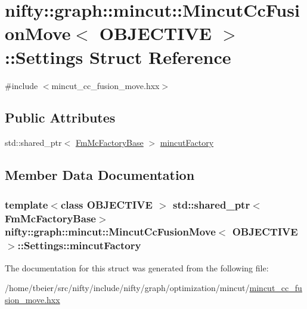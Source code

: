 \hypertarget{structnifty_1_1graph_1_1mincut_1_1MincutCcFusionMove_1_1Settings}{}\section{nifty\+:\+:graph\+:\+:mincut\+:\+:Mincut\+Cc\+Fusion\+Move$<$ O\+B\+J\+E\+C\+T\+I\+V\+E $>$\+:\+:Settings Struct Reference}
\label{structnifty_1_1graph_1_1mincut_1_1MincutCcFusionMove_1_1Settings}


{\ttfamily \#include $<$mincut\+\_\+cc\+\_\+fusion\+\_\+move.\+hxx$>$}

\subsection*{Public Attributes}
\begin{DoxyCompactItemize}
\item 
std\+::shared\+\_\+ptr$<$ \hyperlink{classnifty_1_1graph_1_1mincut_1_1MincutCcFusionMove_a6246ad240ba42965159b1186402d8394}{Fm\+Mc\+Factory\+Base} $>$ \hyperlink{structnifty_1_1graph_1_1mincut_1_1MincutCcFusionMove_1_1Settings_a707b1beef7dd760260d0a1152e1037f1}{mincut\+Factory}
\end{DoxyCompactItemize}


\subsection{Member Data Documentation}
\hypertarget{structnifty_1_1graph_1_1mincut_1_1MincutCcFusionMove_1_1Settings_a707b1beef7dd760260d0a1152e1037f1}{}
\subsubsection[{mincut\+Factory}]{\setlength{\rightskip}{0pt plus 5cm}template$<$class O\+B\+J\+E\+C\+T\+I\+V\+E $>$ std\+::shared\+\_\+ptr$<${\bf Fm\+Mc\+Factory\+Base}$>$ {\bf nifty\+::graph\+::mincut\+::\+Mincut\+Cc\+Fusion\+Move}$<$ O\+B\+J\+E\+C\+T\+I\+V\+E $>$\+::Settings\+::mincut\+Factory}\label{structnifty_1_1graph_1_1mincut_1_1MincutCcFusionMove_1_1Settings_a707b1beef7dd760260d0a1152e1037f1}


The documentation for this struct was generated from the following file\+:\begin{DoxyCompactItemize}
\item 
/home/tbeier/src/nifty/include/nifty/graph/optimization/mincut/\hyperlink{mincut__cc__fusion__move_8hxx}{mincut\+\_\+cc\+\_\+fusion\+\_\+move.\+hxx}\end{DoxyCompactItemize}
